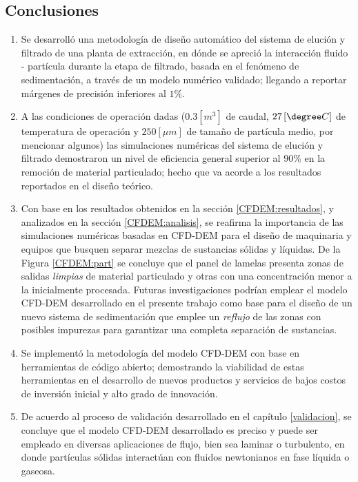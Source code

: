 \begin{center}
	\section{Conclusiones}
\end{center}


\begin{enumerate}
	\item Se desarroll\'o una metodolog\'ia de dise\~no autom\'atico del sistema de eluci\'on y filtrado de una planta de extracci\'on, en d\'onde se apreci\'o la interacci\'on fluido - part\'icula durante la etapa de filtrado, basada en el fen\'omeno de sedimentaci\'on, a trav\'es de un modelo num\'erico validado; llegando a reportar m\'argenes de precisi\'on inferiores al $1 \%$.
	\item A las condiciones de operaci\'on dadas ($0.3 \left[ m^3 \right]$ de caudal, $27 \left[ \degree C \right]$ de temperatura de operaci\'on y $250 [ \mu m]$ de tama\~no de part\'icula medio, por mencionar algunos) las simulaciones num\'ericas del sistema de eluci\'on y filtrado demostraron un nivel de eficiencia general superior al $90 \%$ en la remoci\'on de material particulado; hecho que va acorde a los resultados reportados en el dise\~no te\'orico.
	\item Con base en los resultados obtenidos en la secci\'on \ref{CFDEM:resultados}, y analizados en la secci\'on \ref{CFDEM:analisis}, se reafirma la importancia de las simulaciones num\'ericas basadas en CFD-DEM para el dise\~no de maquinaria y equipos que busquen separar mezclas de sustancias s\'olidas y l\'iquidas. De la Figura \ref{CFDEM:part} se concluye que el panel de lamelas presenta zonas de salidas \textit{limpias} de material particulado y otras con una concentraci\'on menor a la inicialmente procesada. Futuras investigaciones podr\'ian emplear el modelo CFD-DEM desarrollado en el presente trabajo como base para el dise\~no de un nuevo sistema de sedimentaci\'on que emplee un \textit{reflujo} de las zonas con posibles impurezas para garantizar una completa separaci\'on de sustancias.
	\item Se implement\'o la metodolog\'ia del modelo CFD-DEM con base en herramientas de c\'odigo abierto; demostrando la viabilidad de estas herramientas en el desarrollo de nuevos productos y servicios de bajos costos de inversi\'on inicial y alto grado de innovaci\'on.
	\item De acuerdo al proceso de validaci\'on desarrollado en el cap\'itulo \ref{validacion}, se concluye que el modelo CFD-DEM desarrollado es preciso y puede ser empleado en diversas aplicaciones de flujo, bien sea laminar o turbulento, en donde part\'iculas s\'olidas interact\'uan con fluidos newtonianos en fase l\'iquida o gaseosa.
\end{enumerate}
